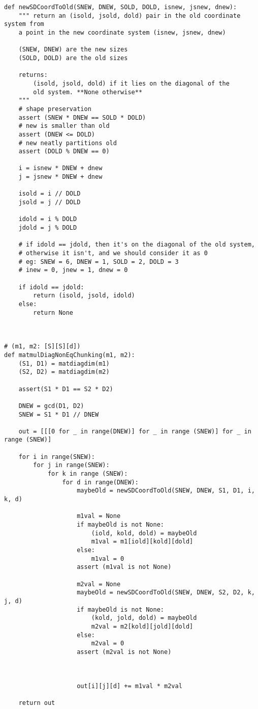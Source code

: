 \documentclass[11pt]{article}
\begin{document}
\begin{verbatim}
def newSDCoordToOld(SNEW, DNEW, SOLD, DOLD, isnew, jsnew, dnew):
    """ return an (isold, jsold, dold) pair in the old coordinate system from 
    a point in the new coordinate system (isnew, jsnew, dnew)

    (SNEW, DNEW) are the new sizes
    (SOLD, DOLD) are the old sizes

    returns:
        (isold, jsold, dold) if it lies on the diagonal of the
        old system. **None otherwise**
    """
    # shape preservation
    assert (SNEW * DNEW == SOLD * DOLD)
    # new is smaller than old
    assert (DNEW <= DOLD)
    # new neatly partitions old
    assert (DOLD % DNEW == 0)

    i = isnew * DNEW + dnew
    j = jsnew * DNEW + dnew

    isold = i // DOLD
    jsold = j // DOLD

    idold = i % DOLD
    jdold = j % DOLD

    # if idold == jdold, then it's on the diagonal of the old system,
    # otherwise it isn't, and we should consider it as 0
    # eg: SNEW = 6, DNEW = 1, SOLD = 2, DOLD = 3
    # inew = 0, jnew = 1, dnew = 0
    
    if idold == jdold:
        return (isold, jsold, idold)
    else:
        return None



# (m1, m2: [S][S][d])
def matmulDiagNonEqChunking(m1, m2):
    (S1, D1) = matdiagdim(m1)
    (S2, D2) = matdiagdim(m2)

    assert(S1 * D1 == S2 * D2)

    DNEW = gcd(D1, D2)
    SNEW = S1 * D1 // DNEW

    out = [[[0 for _ in range(DNEW)] for _ in range (SNEW)] for _ in range (SNEW)]

    for i in range(SNEW):
        for j in range(SNEW):
            for k in range (SNEW):
                for d in range(DNEW):
                    maybeOld = newSDCoordToOld(SNEW, DNEW, S1, D1, i, k, d)

                    m1val = None
                    if maybeOld is not None:
                        (iold, kold, dold) = maybeOld
                        m1val = m1[iold][kold][dold]
                    else:
                        m1val = 0
                    assert (m1val is not None)

                    m2val = None
                    maybeOld = newSDCoordToOld(SNEW, DNEW, S2, D2, k, j, d)
                    if maybeOld is not None:
                        (kold, jold, dold) = maybeOld
                        m2val = m2[kold][jold][dold]
                    else:
                        m2val = 0
                    assert (m2val is not None)



                    out[i][j][d] += m1val * m2val

    return out
\end{verbatim}
\end{document}
